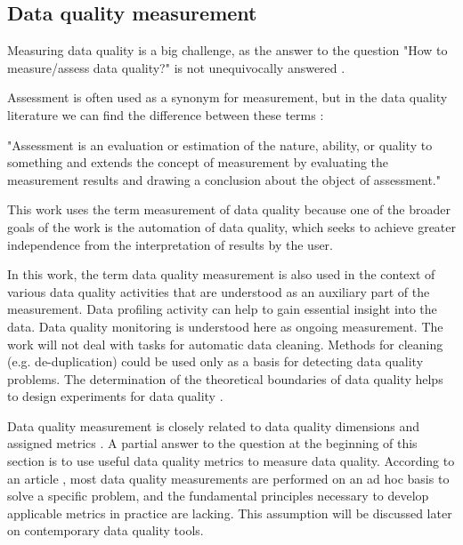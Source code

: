 		\subsection{Data quality measurement}
		\label{subsec:data_quality_measurement}
		
		 	Measuring data quality is a big challenge, as the answer to the question "How to measure/assess data quality?" is not unequivocally answered \cite{Ehrlinger2019}.
		 	
			Assessment is often used as a synonym for measurement, but in the data quality literature we can find the difference between these terms \cite{Ehrlinger2019}:
			
			"Assessment is an evaluation or estimation of the nature, ability, or quality to something and extends the concept of measurement by evaluating the measurement results and drawing a conclusion about the object of assessment." \cite{Ehrlinger2019}		 	
		 	
			This work uses the term measurement of data quality because one of the broader goals of the work is the automation of data quality, which seeks to achieve greater independence from the interpretation of results by the user.
			
		 	In this work, the term data quality measurement is also used in the context of various data quality activities that are understood as an auxiliary part of the measurement. Data profiling activity can help to gain essential insight into the data. Data quality monitoring is understood here as ongoing measurement. The work will not deal with tasks for automatic data cleaning. Methods for cleaning (e.g. de-duplication) could be used only as a basis for detecting data quality problems. The determination of the theoretical boundaries of data quality helps to design experiments for data quality .
			
			Data quality measurement is closely related to data quality dimensions and assigned metrics  \cite{McGilvray2008}. A partial answer to the question at the beginning of this section is to use useful data quality metrics to measure data quality. According to an article \cite{Pipino2002}, most data quality measurements are performed on an ad hoc basis to solve a specific problem, and the fundamental principles necessary to develop applicable metrics in practice are lacking. This assumption will be discussed later  on contemporary data quality tools.
			
